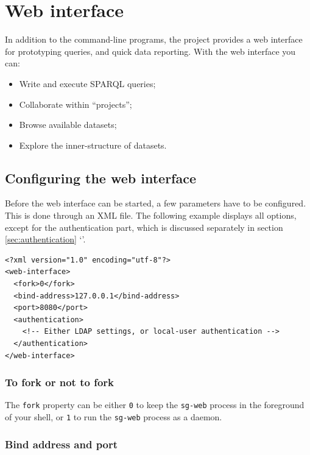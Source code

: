 \chapter{Web interface}
\label{chap:web-interface}

  In addition to the command-line programs, the project provides a web
  interface for prototyping queries, and quick data reporting.  With the
  web interface you can:
  \begin{itemize}
  \item Write and execute SPARQL queries;
  \item Collaborate within ``projects'';
  \item Browse available datasets;
  \item Explore the inner-structure of datasets.
  \end{itemize}

\section{Configuring the web interface}
\label{sec:configuring-sg-web}

  Before the web interface can be started, a few parameters have to be
  configured.  This is done through an XML file.  The following example
  displays all options, except for the authentication part, which is
  discussed separately in section \ref{sec:authentication}
  {\color{LinkGray}`'}.

\begin{siderules}
\begin{verbatim}
<?xml version="1.0" encoding="utf-8"?>
<web-interface>
  <fork>0</fork>
  <bind-address>127.0.0.1</bind-address>
  <port>8080</port>
  <authentication>
    <!-- Either LDAP settings, or local-user authentication -->
  </authentication>
</web-interface>
\end{verbatim}
\end{siderules}

\subsection{To fork or not to fork}

  The \texttt{fork} property can be either \texttt{0} to keep the
  \texttt{sg-web} process in the foreground of your shell, or
  \texttt{1} to run the \texttt{sg-web} process as a daemon.

\subsection{Bind address and port}

